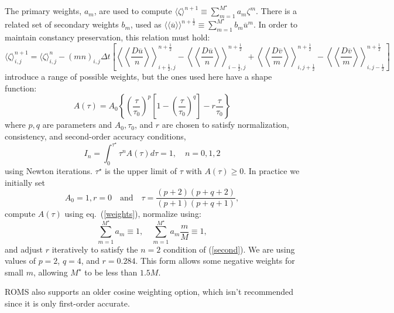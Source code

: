 The primary weights, $a_m$, are used to compute $\langle \zeta
\rangle^{n+1} \equiv \sum_{m=1}^{M^\star} a_m \zeta^m$. There is a
related set of secondary weights $b_m$, used as $\langle \! \langle
\overline{u} \rangle \! \rangle^{n+\frac{1}{2}} \equiv \sum_{m=1}^{M^\star} b_m
\overline{u}^m$. In order to maintain constancy preservation, this
relation must hold:
\begin{equation}
  \langle \zeta \rangle_{i,j}^{n+1} = \langle \zeta \rangle_{i,j}^n -
  (mn)_{i,j} \Delta t \left[ \left\langle \!\! \left\langle
  \frac{D\overline u}{n} \right\rangle \!\!
  \right\rangle_{i+\frac{1}{2},j}^{n+\frac{1}{2}}
  - \left\langle \!\! \left\langle \frac{D\overline u}{n} \right\rangle
  \!\! \right\rangle_{i-\frac{1}{2},j}^{n+\frac{1}{2}} +
  \left\langle \!\! \left\langle
  \frac{D\overline v}{m} \right\rangle \!\!
  \right\rangle_{i,j+\frac{1}{2}}^{n+\frac{1}{2}}
  - \left\langle \!\! \left\langle \frac{D\overline v}{m} \right\rangle
  \!\! \right\rangle_{i,j-\frac{1}{2}}^{n+\frac{1}{2}} \right]
\label{zeta3}
\end{equation}
\citet{SS2005} introduce a range of
possible weights, but the ones used here have a shape function:
\begin{equation}
   A(\tau) = A_0 \left\{ \left( \frac{\tau}{\tau_0} \right)^p \left[ 1-
   \left(\frac{\tau}{\tau_0} \right)^q \right] - r \frac{\tau}{\tau_0}
   \right\}
\label{weights}
\end{equation}
where $p, q$ are parameters and $A_0, \tau_0$, and $r$ are chosen to
satisfy normalization, consistency, and second-order accuracy
conditions,
\begin{equation}
   I_n = \int_0^{\tau^\star} \tau^n A(\tau) d \tau = 1, \quad n=0,1,2
\label{second}
\end{equation}
using Newton iterations. $\tau^\star$ is the upper limit of $\tau$
with $A(\tau) \geq 0$. In practice we initially set
$$
  A_0 = 1, r = 0 \quad \mbox{and} \quad
  \tau = \frac{(p+2)(p+q+2)}{(p+1)(p+q+1)},
$$
compute $A(\tau)$ using eq.~(\ref{weights}), normalize using:
\begin{equation}
   \sum_{m=1}^{M^\star} a_m \equiv 1, \quad
   \sum_{m=1}^{M^\star} a_m\frac{m}{M} \equiv 1,
\end{equation}
and adjust $r$ iteratively to satisfy the $n=2$ condition of
(\ref{second}). We are using values of $p=2$, $q=4$, and $r=0.284$.
This form allows some negative weights for small $m$, allowing
$M^\star$ to be less than $1.5M$.

ROMS also supports an older cosine weighting option, which isn't
recommended since it is only first-order accurate.


